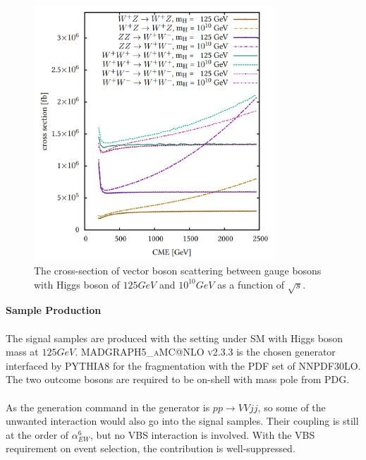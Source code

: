 \begin{figure}[tbp]
	\begin{center}
		\includegraphics[width=0.8\textwidth,keepaspectratio]{Chapter5/VBSXS_heavyhiggs.png}
		\caption{The cross-section of vector boson scattering between gauge bosons with Higgs boson of $125GeV$ and $10^{10}GeV$ as a function of $\sqrt{s}$.\cite{Schnoor:2000941}}
		\label{Fig:VBSXS_heavyhiggs}
	\end{center}
\end{figure} 
\noindent
{\bf Sample Production}
\\
\\The signal samples are produced with the setting under SM with Higgs boson mass at $125GeV$. \textsc{MADGRAPH5\_aMC@NLO v2.3.3}\cite{Alwall:2014hca} is the chosen generator interfaced by \textsc{PYTHIA8}\cite{Sjostrand:2007gs} for the fragmentation with the PDF set of \textsc{NNPDF30LO}\cite{Ball:2012cx}. The two outcome bosons are required to be on-shell with mass pole from PDG. 
\\
\\As the generation command in the generator is $pp \to VVjj$, so some of the unwanted interaction would also go into the signal samples. Their coupling is still at the order of $\alpha_{EW}^6$, but no VBS interaction is involved. With the VBS requirement on event selection, the contribution is well-suppressed. 
\noindent
